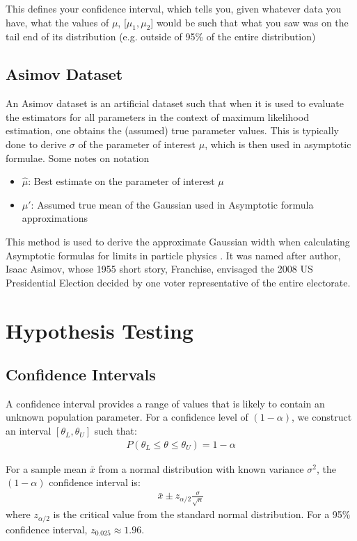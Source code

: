 This defines your confidence interval, which tells you, given whatever data you have, what the values of $\mu$,  [$\mu_1, \mu_2$] would be such that what you saw was on the tail end of its distribution (e.g. outside of 95\% of the entire distribution)

\subsection{Asimov Dataset}
An Asimov dataset is an artificial dataset such that when it is used to evaluate the estimators for all parameters in the context of maximum likelihood estimation, one obtains the (assumed) true parameter values. This is typically done to derive $\sigma$ of the parameter of interest $\mu$, which is then used in asymptotic formulae. Some notes on notation
\begin{itemize}
	\item $\hat{\mu}$: Best estimate on the parameter of interest $\mu$
	\item $\mu'$: Assumed true mean of the Gaussian used in Asymptotic formula approximations
\end{itemize}
This method is used to derive the approximate Gaussian width when calculating Asymptotic formulas for limits in particle physics \cite{cowan}. It was named after author, Isaac Asimov, whose 1955 short story, Franchise, envisaged the 2008 US Presidential Election decided by one voter representative of the entire electorate.



\section{Hypothesis Testing}

\subsection{Confidence Intervals}
A confidence interval provides a range of values that is likely to contain an unknown population parameter. For a confidence level of $(1-\alpha)$, we construct an interval $[\theta_L, \theta_U]$ such that:
\begin{align}
	P(\theta_L \leq \theta \leq \theta_U) = 1 - \alpha
\end{align}

For a sample mean $\bar{x}$ from a normal distribution with known variance $\sigma^2$, the $(1-\alpha)$ confidence interval is:
\begin{align}
	\bar{x} \pm z_{\alpha/2} \frac{\sigma}{\sqrt{n}}
\end{align}
where $z_{\alpha/2}$ is the critical value from the standard normal distribution. For a 95\% confidence interval, $z_{0.025} \approx 1.96$.

